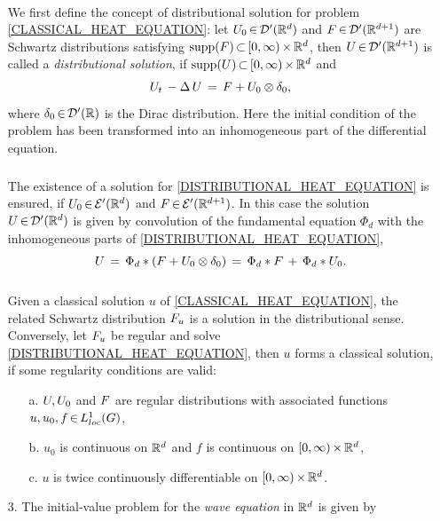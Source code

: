 \documentclass[11pt,twoside]{article}
\begin{document}
\begin{itemize}
\paragraph{} %
We first define the concept of distributional solution
for problem \eqref{CLASSICAL_HEAT_EQUATION}:
let $\disU_0 \xeof \D'(\Rd)$ and $\disF \xeof \D'(\R^{d+1})$ are
Schwartz distributions satisfying 
$\supp{\disF} \xsubset [0,\infty) \xtimes \Rd$,
then $\disU \xeof \D'(\R^{d+1})$ is called a \textit{distributional solution},
if $\supp{\disU} \xsubset [0,\infty) \xtimes \Rd$ and
\begin{equation}\label{DISTRIBUTIONAL_HEAT_EQUATION}
\disU_t \, - \Delta \, \disU \= \disF + \disU_0 \otimes \delta_0,
\end{equation}
where $\delta_0 \xeof \D'(\R)$ is the Dirac distribution.
Here the initial condition of the problem has been transformed
into an inhomogeneous part of the differential equation.

\subparagraph{}
The existence of a solution for \eqref{DISTRIBUTIONAL_HEAT_EQUATION}
is ensured,
if $\disU_0 \xeof \E'(\Rd)$ and $\disF \xeof \E'(\R^{d+1})$.
In this case the solution $\disU \xeof \D'(\Rd)$ is given by
convolution of the fundamental equation $\Phi_d$ 
with the inhomogeneous parts of \eqref{DISTRIBUTIONAL_HEAT_EQUATION},
\[
\disU \=
\Phi_d \ast (\disF + \disU_0 \otimes \delta_0) \=
\Phi_d \ast \disF \, + \, \Phi_d \ast \disU_0.
\]

\subparagraph{}
Given a classical solution $u$ of \eqref{CLASSICAL_HEAT_EQUATION},
the related Schwartz distribution $\disF_u$ is a solution
in the distributional sense.
Conversely,
let $\disF_u$ be regular and solve \eqref{DISTRIBUTIONAL_HEAT_EQUATION},
then $u$ forms a classical solution,
if some regularity conditions are valid:

\begin{itemize}[leftmargin=10mm]
\item[a.]
$\disU, \disU_0$ and $\disF$ are regular distributions
with associated functions $u, u_0, f \xeof \Lc$,

\item[b.]
$u_0$ is continuous on $\Rd$ and
$f$ is continuous on $[0,\infty) \xtimes \Rd$,

\item[c.]
$u$ is twice continuously differentiable on $[0,\infty) \xtimes \Rd$.
\end{itemize}

\item[3.]
The initial-value problem for the \textit{wave equation} in $\Rd$
is given by


\end{itemize}
\end{document}
